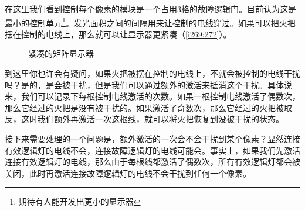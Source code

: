 在这里我们看到控制每个像素的模块是一个占用3格的故障逻辑门。目前认为这是最小的控制单元\footnote{期待有人能开发出更小的显示器}。发光面积之间的间隔用来让控制的电线穿过。如果可以把火把摆在控制的电线上，那么就可以让显示器更紧凑（\autoref{i269:272}）。
\begin{figure}[!h]
\begin{center}
\qquad
{}
\end{center}
\caption{紧凑的矩阵显示器}
\label{i269:272}
\end{figure}

到这里你也许会有疑问，如果火把被摆在控制的电线上，不就会被控制的电线干扰吗？是的，是会被干扰，但是我们可以通过额外的激活来抵消这个干扰。具体说来，我们可以记录下每根控制电线激活的次数。如果一根控制电线激活了偶数次，那么它经过的火把是没有被干扰的。如果激活了奇数次，那么它经过的火把被取反，这时我们额外再激活一次这根线，就可以将火把恢复到没被干扰的状态。

接下来需要处理的一个问题是，额外激活的一次会不会干扰到某个像素？显然连接有效逻辑灯的电线不会，连接故障逻辑灯的电线可能会。事实上，如果我们先激活连接有效逻辑灯的电线，那么由于每根线都激活了偶数次，所有有效逻辑灯都会被关闭，此时再激活连接故障逻辑灯的电线不会干扰到任何一个像素。

